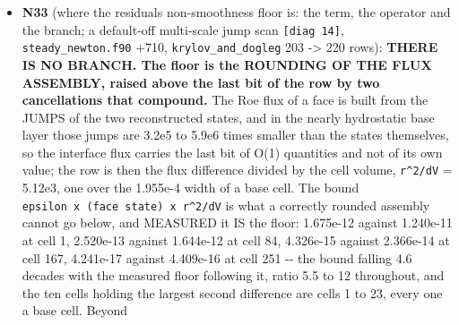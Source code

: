 \documentclass[english,a4paper]{my_memo}
\begin{document}
\begin{itemize}
  left are the reconstruction where the limiter is not the frozen WENO3
  weight, the Riemann wave-speed estimate, \texttt{Apply\_BC}, and the transport
  coefficients of the diffusion operator, which are the one remaining way
  the composition reaches a hydrodynamic row. Advisor: rebuild on \texttt{build\_lwv}; \texttt{krylov\_and\_dogleg} 203/0, \texttt{steady\_species\_rows} 194/0, \texttt{adv\_static\_limit} 53/0, \texttt{residual\_determinism} the same single row FAIL by design; atomic reload at cap 40 with every hook off, 8 threads: the N31 ladder to the digit (1.888, 1.891, 1.819, 1.583, 1.861, 8.964e-1, 7.607e-2; handed back 5.377e-2, spread 3.555e-3), so the worker\textquotesingle s 1.112 at iteration 40 is the thread-count sensitivity of N26c, not a change of the path. The atomic fixture README now states the triplet is on and which branch that selects; \texttt{newton\_dense}\textquotesingle s hardcoded step test recorded in ISSUES 3.7. Accepted; deliverable 2 correctly not built. \textbf{Next item N33}: the jump itself, scanned along the Arnoldi direction across four arcs and split by term and operator (base boundary, reconstruction, Riemann flux, caloric inversion, composition read, transport sources).
\item
  \textbf{N33} (where the residual\textquotesingle s non-smoothness floor is: the term, the
  operator and the branch; a default-off multi-scale jump scan
  \texttt{{[}diag\ 14{]}}, \texttt{steady\_newton.f90} +710, \texttt{krylov\_and\_dogleg} 203 -\textgreater{} 220
  rows): \textbf{THERE IS NO BRANCH. The floor is the ROUNDING OF THE FLUX
  ASSEMBLY, raised above the last bit of the row by two cancellations
  that compound.} The Roe flux of a face is built from the JUMPS of the
  two reconstructed states, and in the nearly hydrostatic base layer
  those jumps are 3.2e5 to 5.9e6 times smaller than the states
  themselves, so the interface flux carries the last bit of O(1)
  quantities and not of its own value; the row is then the flux
  difference divided by the cell volume, \texttt{r\^{}2/dV} = 5.12e3, one over the
  1.955e-4 width of a base cell. The bound
  \texttt{epsilon\ x\ (face\ state)\ x\ r\^{}2/dV} is what a correctly rounded assembly
  cannot go below, and MEASURED it IS the floor: 1.675e-12 against
  1.240e-11 at cell 1, 2.520e-13 against 1.644e-12 at cell 84, 4.326e-15
  against 2.366e-14 at cell 167, 4.241e-17 against 4.409e-16 at cell 251
  -\/- the bound falling 4.6 decades with the measured floor following it,
  ratio 5.5 to 12 throughout, and the ten cells holding the largest
  second difference are cells 1 to 23, every one a base cell. Beyond

\end{itemize}
\end{document}
